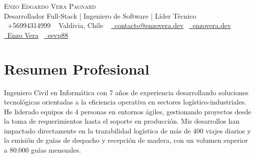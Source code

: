 \documentclass[letterpaper,11pt]{article}
\begin{document}

\begin{center}
    {\Huge \scshape Enzo Edgardo Vera Pagnard} \\ \vspace{1pt}
    Desarrollador Full-Stack | Ingeniero de Software | Líder Técnico\\ \vspace{1pt}
    \small \raisebox{-0.1\height}\faWhatsapp\ +56994314999 ~ 
    Valdivia, Chile ~ 
    \href{mailto:contacto@enzovera.dev}{\raisebox{-0.2\height}\faEnvelope\ \underline{contacto@enzovera.dev}}~ 
    \href{https://enzovera.dev/}{\raisebox{-0.2\height}\faDesktop\ \underline{enzovera.dev}}~ 
    \href{https://www.linkedin.com/in/enzoverapagnard/}{\raisebox{-0.2\height}\faLinkedin\ \underline{Enzo Vera}}~
    \href{https://github.com/eevp88}{\raisebox{-0.2\height}\faGithub\ \underline{eevp88}}
    \vspace{-6pt}
\end{center}

\vspace{-6pt}
\section{Resumen Profesional}
\begin{justify}
Ingeniero Civil en Informática con 7 años de experiencia desarrollando soluciones tecnológicas orientadas a la eficiencia operativa en sectores logístico-industriales.  
He liderado equipos de 4 personas en entornos ágiles, gestionando proyectos desde la toma de requerimientos hasta el soporte en producción. 
Mis desarrollos han impactado directamente en la trazabilidad logística de más de 400 viajes diarios y la emisión de guías de despacho y recepción de madera, con un volumen superior a 80.000 guías mensuales.
\end{justify}
\end{document}
